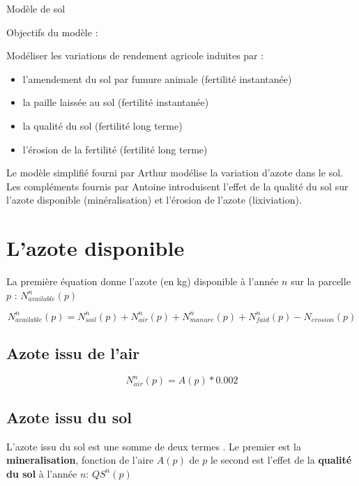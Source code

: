 \documentclass[10pt,a4paper,french]{article} %
\begin{document}
Modèle de sol 

Objectifs du modèle :


Modéliser les variations de rendement agricole induites par : 

\begin{itemize}
	\item l'amendement du sol par fumure animale  (fertilité instantanée)
	\item la paille laissée au sol (fertilité instantanée)
	\item la qualité du sol (fertilité long terme)
	\item l'érosion de la fertilité (fertilité long terme)
\end{itemize} 

\vspace{0.5cm}
Le modèle simplifié fourni par Arthur modélise la variation d'azote dans le sol. 
Les compléments fournis par Antoine introduisent l'effet de la qualité du sol sur l'azote disponible (minéralisation) et l'érosion de l'azote (lixiviation). 



\section{L'azote disponible}



La première équation donne l'azote (en kg) disponible à l'année $n$ sur la parcelle $p$ : $N_{available}^{n}(p)$

\begin{equation}
N_{available}^{n}(p)=N_{soil}^{n}(p)+N_{air}^{n}(p)+N_{manure}^{n}(p)+N_{faid}^{n}(p)-N_{erosion}(p)
\end{equation}


\subsection{Azote issu de l'air}




\begin{equation}
N_{air}^{n}(p) = A(p) * 0.002
\end{equation}

\subsection{Azote issu du sol}


L'azote issu du sol est une somme de deux termes . Le premier est la \textbf{mineralisation}, fonction de l'aire $A(p)$ de $p$ le second est l'effet de la \textbf{qualité du sol} à l'année $n$:  $QS^{n}(p)$
\end{document}
